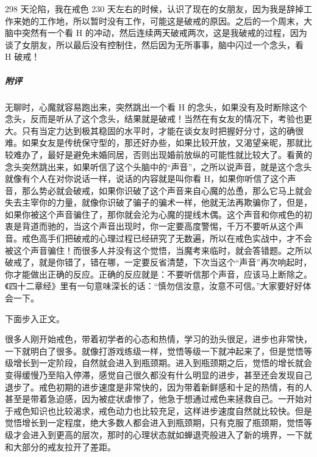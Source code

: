 \begin{case}
    298 天沦陷，我在戒色 230 天左右的时候，认识了现在的女朋友，因为我是辞掉工作来她的工作地，所以暂时没有工作，可能这是破戒的原因。之后的一个周末，大脑中突然有一个看 H 的冲动，然后连续两天破戒两次，这是我破戒的过程，因为谈了女朋友，所以最后没有控制住，然后因为无所事事，脑中闪过一个念头，看 H 破戒！
    \subparagraph{附评} 无聊时，心魔就容易跑出来，突然跳出一个看 H 的念头，如果没有及时断除这个念头，反而是听从了这个念头，结果就是破戒！当然在有女友的情况下，考验也更大。只有当定力达到极其稳固的水平时，才能在谈女友时把握好分寸，这的确很难。如果女友是传统保守型的，那还好办些，如果比较开放，又渴望亲昵，那就比较难办了，最好是避免未婚同居，否则出现婚前放纵的可能性就比较大了。看黄的念头突然跳出来，如果听信了这个头脑中的“声音”，之所以说声音，就是这个念头就像有个人在对你说话一样，说话的内容就是叫你看 H，如果你听信了这个声音，那么势必就会破戒，如果你识破了这个声音来自心魔的怂恿，那么它马上就会失去主宰你的力量，就像你识破了骗子的骗术一样，他就无法再欺骗你了，但是，如果你被这个声音骗住了，那你就会沦为心魔的提线木偶。这个声音和你戒色的初衷是背道而驰的，当这个声音出现时，你一定要高度警惕，千万不要听从这个声音。戒色高手们把破戒的心理过程已经研究了无数遍，所以在戒色实战中，才不会被这个声音骗住！而很多人并没有这个觉悟，当魔考来临时，就会答错题。之所以破戒了，就是你错了，错在哪，一定要反省清楚，下次当这个“声音”再次响起时，你才能做出正确的反应。正确的反应就是：不要听信那个声音，应该马上断除之。《四十二章经》里有一句意味深长的话：“慎勿信汝意，汝意不可信。”大家要好好体会一下。
\end{case}

下面步入正文。

很多人刚开始戒色，带着初学者的心态和热情，学习的劲头很足，进步也非常快，一下就明白了很多。就像打游戏练级一样，觉悟等级一下就冲起来了，但是觉悟等级增长到一定阶段，自然就会进入到瓶颈期。进入到瓶颈期之后，觉悟的增长就会变得缓慢乃至陷入停滞，感觉自己很久都没有什么明显的进步，甚至还会发现自己退步了。戒色初期的进步速度是非常快的，因为带着新鲜感和十足的热情，有的人甚至是带着急迫感，因为被症状虐惨了，他急于想通过戒色来拯救自己。一开始对于戒色知识也比较渴求，戒色动力也比较充足，这样进步速度自然就比较快。但是觉悟增长到一定程度，绝大多数人都会进入到瓶颈期，只有克服了瓶颈期，觉悟等级才会进入到更高的层次，那时的心理状态就如蝉退壳般进入了新的境界，一下就和大部分的戒友拉开了差距。

